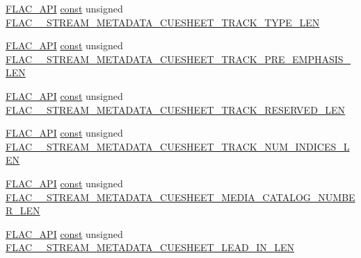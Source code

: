\begin{DoxyCompactItemize}
\item 
\hyperlink{group__flac__export_ga56ca07df8a23310707732b1c0007d6f5}{F\+L\+A\+C\+\_\+\+A\+PI} \hyperlink{getopt1_8c_a2c212835823e3c54a8ab6d95c652660e}{const} unsigned \hyperlink{group__flac__format_ga214d2c105a5712dea76c0a9802843fba}{F\+L\+A\+C\+\_\+\+\_\+\+S\+T\+R\+E\+A\+M\+\_\+\+M\+E\+T\+A\+D\+A\+T\+A\+\_\+\+C\+U\+E\+S\+H\+E\+E\+T\+\_\+\+T\+R\+A\+C\+K\+\_\+\+T\+Y\+P\+E\+\_\+\+L\+EN}
\item 
\hyperlink{group__flac__export_ga56ca07df8a23310707732b1c0007d6f5}{F\+L\+A\+C\+\_\+\+A\+PI} \hyperlink{getopt1_8c_a2c212835823e3c54a8ab6d95c652660e}{const} unsigned \hyperlink{group__flac__format_gaa50843400f847963958b622e32c7afb1}{F\+L\+A\+C\+\_\+\+\_\+\+S\+T\+R\+E\+A\+M\+\_\+\+M\+E\+T\+A\+D\+A\+T\+A\+\_\+\+C\+U\+E\+S\+H\+E\+E\+T\+\_\+\+T\+R\+A\+C\+K\+\_\+\+P\+R\+E\+\_\+\+E\+M\+P\+H\+A\+S\+I\+S\+\_\+\+L\+EN}
\item 
\hyperlink{group__flac__export_ga56ca07df8a23310707732b1c0007d6f5}{F\+L\+A\+C\+\_\+\+A\+PI} \hyperlink{getopt1_8c_a2c212835823e3c54a8ab6d95c652660e}{const} unsigned \hyperlink{group__flac__format_ga1a469393239653b050c7cc3484d33bef}{F\+L\+A\+C\+\_\+\+\_\+\+S\+T\+R\+E\+A\+M\+\_\+\+M\+E\+T\+A\+D\+A\+T\+A\+\_\+\+C\+U\+E\+S\+H\+E\+E\+T\+\_\+\+T\+R\+A\+C\+K\+\_\+\+R\+E\+S\+E\+R\+V\+E\+D\+\_\+\+L\+EN}
\item 
\hyperlink{group__flac__export_ga56ca07df8a23310707732b1c0007d6f5}{F\+L\+A\+C\+\_\+\+A\+PI} \hyperlink{getopt1_8c_a2c212835823e3c54a8ab6d95c652660e}{const} unsigned \hyperlink{group__flac__format_ga34226e52846bbcba46b278f297880637}{F\+L\+A\+C\+\_\+\+\_\+\+S\+T\+R\+E\+A\+M\+\_\+\+M\+E\+T\+A\+D\+A\+T\+A\+\_\+\+C\+U\+E\+S\+H\+E\+E\+T\+\_\+\+T\+R\+A\+C\+K\+\_\+\+N\+U\+M\+\_\+\+I\+N\+D\+I\+C\+E\+S\+\_\+\+L\+EN}
\item 
\hyperlink{group__flac__export_ga56ca07df8a23310707732b1c0007d6f5}{F\+L\+A\+C\+\_\+\+A\+PI} \hyperlink{getopt1_8c_a2c212835823e3c54a8ab6d95c652660e}{const} unsigned \hyperlink{group__flac__format_ga2f453e18dc7e33456cdd744ee7926f83}{F\+L\+A\+C\+\_\+\+\_\+\+S\+T\+R\+E\+A\+M\+\_\+\+M\+E\+T\+A\+D\+A\+T\+A\+\_\+\+C\+U\+E\+S\+H\+E\+E\+T\+\_\+\+M\+E\+D\+I\+A\+\_\+\+C\+A\+T\+A\+L\+O\+G\+\_\+\+N\+U\+M\+B\+E\+R\+\_\+\+L\+EN}
\item 
\hyperlink{group__flac__export_ga56ca07df8a23310707732b1c0007d6f5}{F\+L\+A\+C\+\_\+\+A\+PI} \hyperlink{getopt1_8c_a2c212835823e3c54a8ab6d95c652660e}{const} unsigned \hyperlink{group__flac__format_ga5b9607000b777c7a7be84062754e0363}{F\+L\+A\+C\+\_\+\+\_\+\+S\+T\+R\+E\+A\+M\+\_\+\+M\+E\+T\+A\+D\+A\+T\+A\+\_\+\+C\+U\+E\+S\+H\+E\+E\+T\+\_\+\+L\+E\+A\+D\+\_\+\+I\+N\+\_\+\+L\+EN}

\end{DoxyCompactItemize}
